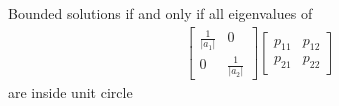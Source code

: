 \documentclass[12pt]{article}
\begin{document}
Bounded solutions if and only if all eigenvalues of 
\begin{gather}
  \label{eq:5}
  \begin{bmatrix}
    \frac{1}{|a_1|}&0\\
0&    \frac{1}{|a_2|}
  \end{bmatrix}
  \begin{bmatrix}
    p_{11}&p_{12}\\p_{21}&p_{22}
  \end{bmatrix}
\end{gather}
 are inside unit circle










\end{document}
